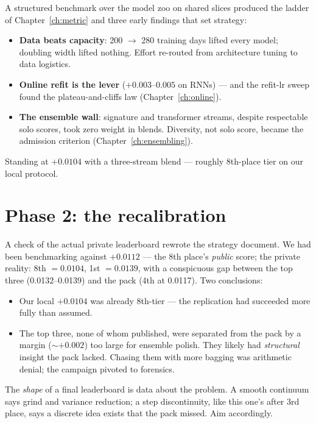 A structured benchmark over the model zoo on shared slices produced the
ladder of Chapter~\ref{ch:metric} and three early findings that set
strategy:

\begin{itemize}
\item \textbf{Data beats capacity}: 200 $\to$ 280 training days lifted
  every model; doubling width lifted nothing. Effort re-routed from
  architecture tuning to data logistics.
\item \textbf{Online refit is the lever} ($+0.003$--$0.005$ on RNNs) ---
  and the refit-lr sweep found the plateau-and-cliffs law
  (Chapter~\ref{ch:online}).
\item \textbf{The ensemble wall}: signature and transformer streams,
  despite respectable solo scores, took zero weight in blends. Diversity,
  not solo score, became the admission criterion
  (Chapter~\ref{ch:ensembling}).
\end{itemize}

Standing at $+0.0104$ with a three-stream blend --- roughly 8th-place
tier on our local protocol.

\section{Phase 2: the recalibration}

A check of the actual private leaderboard rewrote the strategy document.
We had been benchmarking against $+0.0112$ --- the 8th place's
\emph{public} score; the private reality: 8th $= 0.0104$, 1st
$= \bm{0.0139}$, with a conspicuous gap between the top three
(0.0132--0.0139) and the pack (4th at 0.0117). Two conclusions:

\begin{itemize}
\item Our local $+0.0104$ was already 8th-tier --- the replication had
  succeeded more fully than assumed.
\item The top three, none of whom published, were separated from the pack
  by a margin ($\sim +0.002$) too large for ensemble polish. They likely
  had \emph{structural} insight the pack lacked. Chasing them with more
  bagging was arithmetic denial; the campaign pivoted to forensics.
\end{itemize}

\begin{keybox}
The \emph{shape} of a final leaderboard is data about the problem.
A smooth continuum says grind and variance reduction; a step
discontinuity, like this one's after 3rd place, says a discrete idea
exists that the pack missed. Aim accordingly.
\end{keybox}

